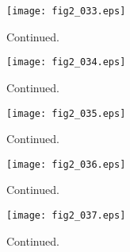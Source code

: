 \documentclass[preprint]{aastex}
\begin{document}
\setcounter{figure}{1}
\begin{figure}[t]
\centering
\texttt{[image: fig2\_033.eps]}
\caption{
Continued. 
}
\label{Fig2}
\end{figure}
\clearpage



\setcounter{figure}{1}
\begin{figure}[t]
\centering
\texttt{[image: fig2\_034.eps]}
\caption{
Continued. 
}
\label{Fig2}
\end{figure}
\clearpage



\setcounter{figure}{1}
\begin{figure}[t]
\centering
\texttt{[image: fig2\_035.eps]}
\caption{
Continued. 
}
\label{Fig2}
\end{figure}
\clearpage



\setcounter{figure}{1}
\begin{figure}[t]
\centering
\texttt{[image: fig2\_036.eps]}
\caption{
Continued. 
}
\label{Fig2}
\end{figure}
\clearpage



\setcounter{figure}{1}
\begin{figure}[t]
\centering
\texttt{[image: fig2\_037.eps]}
\caption{
Continued. 
}
\label{Fig2}
\end{figure}
\clearpage
\end{document}

